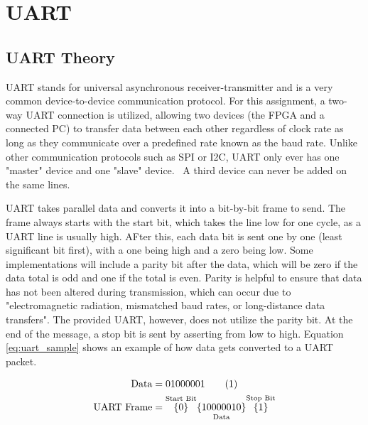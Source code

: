 \documentclass[11pt]{article}
\begin{document}
\section{UART}
\subsection{UART Theory}
UART stands for universal asynchronous receiver-transmitter and is a very common device-to-device communication protocol\cite{UART}.
For this assignment, a two-way UART connection is utilized,
allowing two devices (the FPGA and a connected PC) to transfer data between each other regardless of clock rate as long as they communicate over a predefined rate known as the baud rate.
Unlike other communication protocols such as SPI or I2C, UART only ever has one "master" device and one "slave" device. \
A third device can never be added on the same lines.

UART takes parallel data and converts it into a bit-by-bit frame to send.
The frame always starts with the start bit, which takes the line low for one cycle, as a UART line is usually high.
AFter this, each data bit is sent one by one (least significant bit first), with a one being high and a zero being low.
Some implementations will include a parity bit after the data, which will be zero if the data total is odd and one if the total is even.
Parity is helpful to ensure that data has not been altered during transmission, which can occur due to "electromagnetic radiation, mismatched baud rates, or long-distance data transfers"\cite{UART}.
The provided UART, however, does not utilize the parity bit.
At the end of the message, a stop bit is sent by asserting from low to high.
Equation \ref{eq:uart_sample} shows an example of how data gets converted to a UART packet.

\begin{align*}
    \text{Data} &= 01000001
    \stepcounter{equation}\tag{\theequation}\label{eq:uart_sample} \\
    \text{UART Frame} &=    \overset{\text{Start Bit}}{\{0\}}
                            \underset{\text{Data}}{\{1000 0010\}}
                            \overset{\text{Stop Bit}}{\{1\}}\\
\end{align*}
\end{document}
